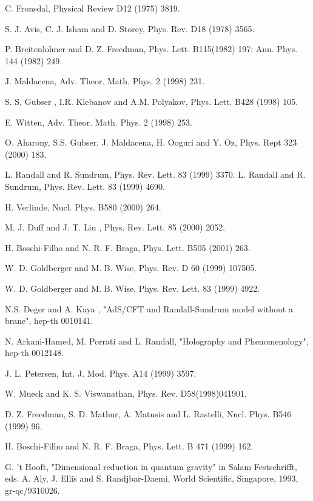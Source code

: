 \documentclass[a4paper,12pt]{article}
\begin{document}
\begin{thebibliography}{99}
 C. Fronsdal, Physical Review D12 (1975) 3819.

 S. J. Avis, C. J. Isham and D. Storey, Phys. Rev. D18
(1978) 3565.

 P. Breitenlohner and D. Z. Freedman, 
Phys. Lett. B115(1982) 197; Ann. Phys. 144 (1982) 249.

 J. Maldacena, Adv. Theor. Math. Phys. 2 (1998) 231.

 S. S. Gubser , I.R. Klebanov and A.M. Polyakov, 
Phys. Lett. B428 (1998) 105.

 E. Witten, Adv. Theor. Math. Phys. 2 (1998) 253.

 O. Aharony, S.S. Gubser, J. Maldacena, 
H. Ooguri and Y. Oz, Phys. Rept 323 (2000) 183.

 L. Randall and R. Sundrum, Phys. Rev. Lett. 83 (1999) 
3370.
 L. Randall and R. Sundrum, Phys. Rev. Lett. 83 (1999)
4690.

 H. Verlinde, Nucl. Phys. B580 (2000) 264.

 M. J. Duff and J. T. Liu , Phys. Rev. Lett. 85 (2000) 2052. 

 H. Boschi-Filho and N. R. F. Braga,
Phys. Lett. B505 (2001) 263.

 W. D. Goldberger and M. B. Wise, 
Phys. Rev. D 60 (1999) 107505.

 W. D. Goldberger and M. B. Wise, 
Phys. Rev. Lett. 83 (1999) 4922.

 N.S. Deger  and A. Kaya , "AdS/CFT and Randall-Sundrum model
without a brane", hep-th 0010141.

 N. Arkani-Hamed, M. Porrati and L. Randall, 
"Holography and Phenomenology", hep-th 0012148.

 J. L. Petersen, Int. J. Mod. Phys. A14 (1999) 3597.

 W. Mueck and K. S. Viswanathan, Phys. Rev. D58(1998)041901.

 D. Z. Freedman, S. D. Mathur, A. Matusis and L. Rastelli,
Nucl. Phys. B546 (1999) 96.

 H. Boschi-Filho and N. R. F. Braga, Phys. Lett. B 
471 (1999) 162.

 G. 't Hooft, "Dimensional reduction in quantum gravity"
in Salam Festschrifft, eds. A. Aly, J. Ellis and S. Randjbar-Daemi,
 World Scientific, Singapore, 1993, gr-qc/9310026.


\end{thebibliography}
\end{document}
